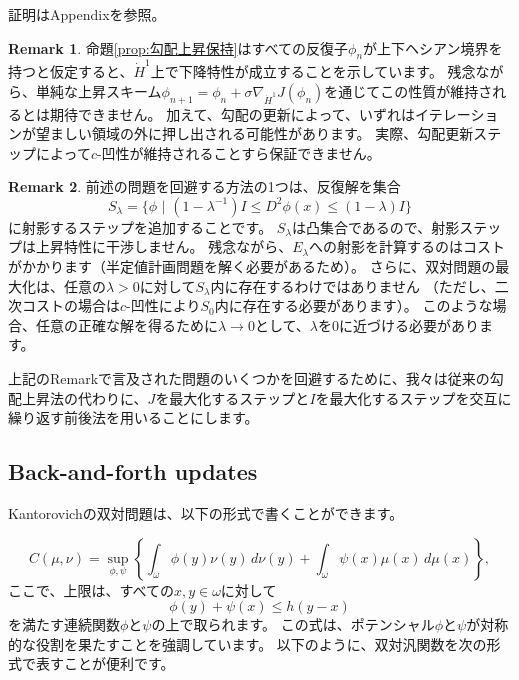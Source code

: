 \documentclass{jsarticle}
\theoremstyle{definition}
\newtheorem{rem}{Remark}[section]
\begin{document}
証明はAppendixを参照。

\begin{rem}
  命題\ref{prop:勾配上昇保持}はすべての反復子$\phi_n$が上下ヘシアン境界を持つと仮定すると、$\dot{H}^1$上で下降特性が成立することを示しています。
  残念ながら、単純な上昇スキーム$\phi_{n+1} = \phi_n + \sigma \nabla_{\dot{H}^1} J (\phi_n)$を通じてこの性質が維持されるとは期待できません。
  加えて、勾配の更新によって、いずれはイテレーションが望ましい領域の外に押し出される可能性があります。
  実際、勾配更新ステップによって$c$-凹性が維持されることすら保証できません。
\end{rem}


\begin{rem}
  前述の問題を回避する方法の1つは、反復解を集合
  $$
  S_{\lambda} = \{\phi \,\, | \,\, (1-\lambda^{-1})I \leq D^2\phi(x) \leq (1-\lambda)I \}
  $$
  に射影するステップを追加することです。
  $S_{\lambda}$は凸集合であるので、射影ステップは上昇特性に干渉しません。
  残念ながら、$E_\lambda$への射影を計算するのはコストがかかります（半定値計画問題を解く必要があるため）。
  さらに、双対問題の最大化は、任意の$\lambda > 0$に対して$S_\lambda$内に存在するわけではありません
  （ただし、二次コストの場合は$c$-凹性により$S_0$内に存在する必要があります）。
  このような場合、任意の正確な解を得るために$\lambda \to 0$として、$\lambda$を$0$に近づける必要があります。
\end{rem}

\vspace\baselineskip 

上記のRemarkで言及された問題のいくつかを回避するために、我々は従来の勾配上昇法の代わりに、$J$を最大化するステップと$I$を最大化するステップを交互に繰り返す前後法を用いることにします。



\subsection{Back-and-forth updates}

Kantorovichの双対問題は、以下の形式で書くことができます。

\begin{equation}
  \label{eq:Kantorovich問題}
  C(\mu,\nu)=\sup_{\phi,\psi} \left\{\int_\omega \phi(y) \nu(y) \,d\nu(y)+\int_\omega \psi(x) \mu(x)\,d\mu(x)\right\},
\end{equation}
ここで、上限は、すべての$x,y\in \omega$に対して
$$
\phi(y)+\psi(x)\leq h(y-x)
$$
を満たす連続関数$\phi$と$\psi$の上で取られます。
この式は、ポテンシャル$\phi$と$\psi$が対称的な役割を果たすことを強調しています。
以下のように、双対汎関数を次の形式で表すことが便利です。
\end{document}
